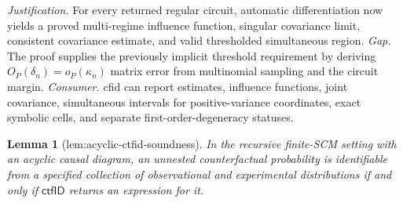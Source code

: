 \documentclass{article}
\newtheorem{lemma}{Lemma}
\begin{document}
\par\smallskip\noindent \textit{Justification.} For every returned regular circuit, automatic differentiation now yields a proved multi-regime influence function, singular covariance limit, consistent covariance estimate, and valid thresholded simultaneous region. \textit{Gap.} The proof supplies the previously implicit threshold requirement by deriving \(O_P(\delta_n)=o_P(\kappa_n)\) matrix error from multinomial sampling and the circuit margin. \textit{Consumer.} cfid can report estimates, influence functions, joint covariance, simultaneous intervals for positive-variance coordinates, exact symbolic cells, and separate first-order-degeneracy statuses.

\begin{lemma}[lem:acyclic-ctfid-soundness]\label{lem:acyclic-ctfid-soundness}
In the recursive finite-SCM setting with an acyclic causal diagram, an unnested counterfactual probability is identifiable from a specified collection of observational and experimental distributions if and only if \(\mathsf{ctfID}\) returns an expression for it.
\end{lemma}
\end{document}
